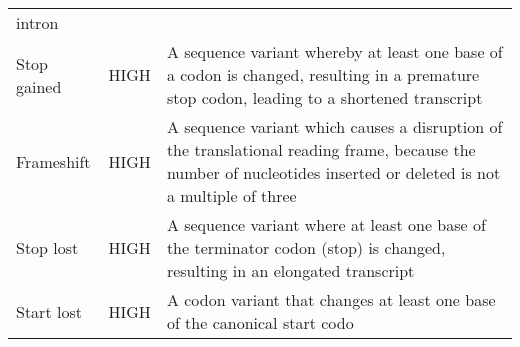 \documentclass[12pt,twoside]{reedthesis}
\theoremstyle{definition}
\theoremstyle{definition}
\theoremstyle{remark}
\begin{document}
\begin{longtable}[]{@{}lll@{}}
\begin{minipage}[t]{0.63\columnwidth}
  intron\strut
  \end{minipage}\tabularnewline
  \begin{minipage}[t]{0.18\columnwidth}\raggedright\strut
  Stop gained\strut
  \end{minipage} & \begin{minipage}[t]{0.11\columnwidth}\raggedright\strut
  HIGH\strut
  \end{minipage} & \begin{minipage}[t]{0.63\columnwidth}\raggedright\strut
  A sequence variant whereby at least one base of a codon is changed,
  resulting in a premature stop codon, leading to a shortened
  transcript\strut
  \end{minipage}\tabularnewline
  \begin{minipage}[t]{0.18\columnwidth}\raggedright\strut
  Frameshift\strut
  \end{minipage} & \begin{minipage}[t]{0.11\columnwidth}\raggedright\strut
  HIGH\strut
  \end{minipage} & \begin{minipage}[t]{0.63\columnwidth}\raggedright\strut
  A sequence variant which causes a disruption of the translational
  reading frame, because the number of nucleotides inserted or deleted is
  not a multiple of three\strut
  \end{minipage}\tabularnewline
  \begin{minipage}[t]{0.18\columnwidth}\raggedright\strut
  Stop lost\strut
  \end{minipage} & \begin{minipage}[t]{0.11\columnwidth}\raggedright\strut
  HIGH\strut
  \end{minipage} & \begin{minipage}[t]{0.63\columnwidth}\raggedright\strut
  A sequence variant where at least one base of the terminator codon
  (stop) is changed, resulting in an elongated transcript\strut
  \end{minipage}\tabularnewline
  \begin{minipage}[t]{0.18\columnwidth}\raggedright\strut
  Start lost\strut
  \end{minipage} & \begin{minipage}[t]{0.11\columnwidth}\raggedright\strut
  HIGH\strut
  \end{minipage} & \begin{minipage}[t]{0.63\columnwidth}\raggedright\strut
  A codon variant that changes at least one base of the canonical start
  codo\strut

\end{minipage}
\end{longtable}
\end{document}
